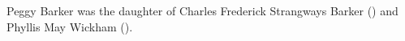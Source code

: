 
Peggy Barker was the daughter of Charles Frederick Strangways Barker () and Phyllis May Wickham ().
